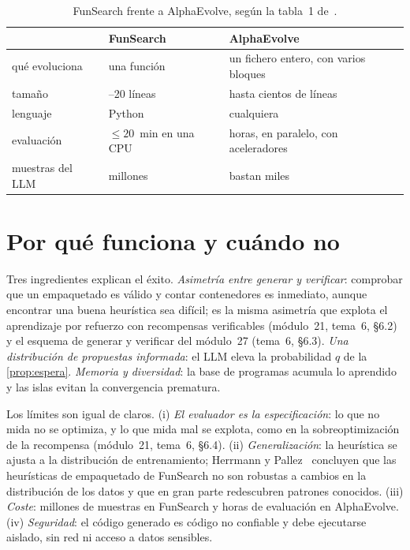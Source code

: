 \begin{table}[h]
\centering\small
\caption{FunSearch frente a AlphaEvolve, según la tabla~1 de~\cite{alphaevolve}.}\label{tab:fs-ae}
\begin{tabularx}{\textwidth}{@{}>{\raggedright\arraybackslash}p{3.0cm}>{\raggedright\arraybackslash}X>{\raggedright\arraybackslash}X@{}}
\toprule
 & FunSearch & AlphaEvolve \\
\midrule
qué evoluciona & una función & un fichero entero, con varios bloques \\
tamaño & 10--20 líneas & hasta cientos de líneas \\
lenguaje & Python & cualquiera \\
evaluación & $\le 20$~min en una CPU & horas, en paralelo, con aceleradores \\
muestras del LLM & millones & bastan miles \\
\bottomrule
\end{tabularx}
\end{table}

\addtocounter{definicion}{1}%

\section{Por qué funciona y cuándo no}

Tres ingredientes explican el éxito. \emph{Asimetría entre generar y verificar}: comprobar que un empaquetado es válido y contar contenedores es inmediato, aunque encontrar una buena heurística sea difícil; es la misma asimetría que explota el aprendizaje por refuerzo con recompensas verificables (módulo~21, tema~6, §6.2) y el esquema de generar y verificar del módulo~27 (tema~6, §6.3). \emph{Una distribución de propuestas informada}: el LLM eleva la probabilidad $q$ de la \cref{prop:espera}. \emph{Memoria y diversidad}: la base de programas acumula lo aprendido y las islas evitan la convergencia prematura.

Los límites son igual de claros. (i) \emph{El evaluador es la especificación}: lo que no mida no se optimiza, y lo que mida mal se explota, como en la sobreoptimización de la recompensa (módulo~21, tema~6, §6.4). (ii) \emph{Generalización}: la heurística se ajusta a la distribución de entrenamiento; Herrmann y Pallez~\cite{hp} concluyen que las heurísticas de empaquetado de FunSearch no son robustas a cambios en la distribución de los datos y que en gran parte redescubren patrones conocidos. (iii) \emph{Coste}: millones de muestras en FunSearch y horas de evaluación en AlphaEvolve. (iv) \emph{Seguridad}: el código generado es código no confiable y debe ejecutarse aislado, sin red ni acceso a datos sensibles.

